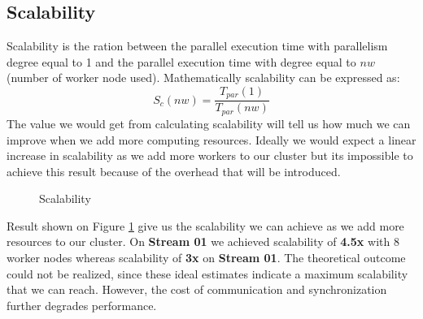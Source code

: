 \documentclass[12pt,a4paper]{report}
\begin{document}
\subsection{Scalability}
Scalability is the ration between the parallel execution time with parallelism degree equal to 1 and the parallel execution time with degree equal to $nw$ (number of worker node used). Mathematically scalability can be expressed as:
\begin{equation}
S_c(nw) = \frac{T_{par}(1)}{T_{par}(nw)} 
\end{equation}
The value we would get from calculating scalability will tell us how much we can improve when we add more computing resources. Ideally we would expect a linear increase in scalability as we add more workers to our cluster but its impossible to achieve this result because of the overhead that will be introduced.

\begin{figure}[H]%
    \centering
    \qquad
    \caption{Scalability}%
    \label{fig:scalabilityy}%
\end{figure}

Result shown on Figure \ref{fig:scalabilityy} give us the scalability we can achieve as we add more resources to our cluster. On \textbf{Stream 01} we achieved scalability of \textbf{4.5x} with 8 worker nodes whereas scalability of \textbf{3x} on \textbf{Stream 01}. The theoretical outcome could not be realized, since these ideal estimates indicate a maximum scalability that we can reach. However, the cost of communication and synchronization further degrades performance.
\end{document}
